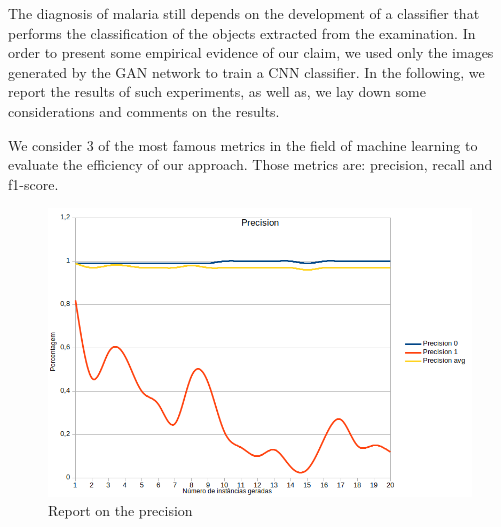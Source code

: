 
%


The diagnosis of malaria still depends on the development of a classifier that performs the classification of the objects extracted from the examination. 
In order to present some empirical evidence of our claim, we used only the images generated by the GAN network to train a CNN classifier. In the following, we report the results of such experiments, as well as, we lay down some considerations and comments on the results.

We consider 3 of the most famous metrics in the field of machine learning to evaluate the efficiency of our approach. Those metrics are: precision, recall and f1-score. 

\begin{figure}[h]
\caption{Report on the precision}
\label{fig:precision}
\begin{center}
\includegraphics[scale=0.40]{./images/figura1.png} \end{center}
\end{figure}

